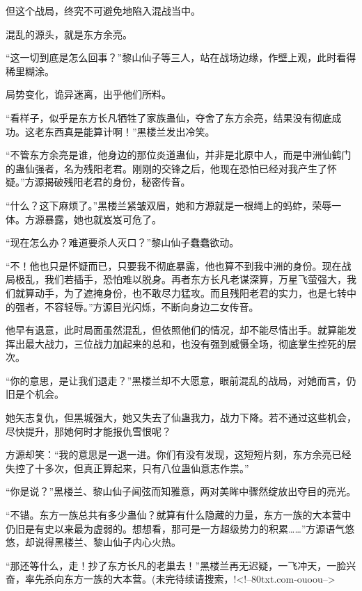 \begin{this_body}
但这个战局，终究不可避免地陷入混战当中。

混乱的源头，就是东方余亮。

“这一切到底是怎么回事？”黎山仙子等三人，站在战场边缘，作壁上观，此时看得稀里糊涂。

局势变化，诡异迷离，出乎他们所料。

“看样子，似乎是东方长凡牺牲了家族蛊仙，夺舍了东方余亮，结果没有彻底成功。这老东西真是能算计啊！”黑楼兰发出冷笑。

“不管东方余亮是谁，他身边的那位炎道蛊仙，并非是北原中人，而是中洲仙鹤门的蛊仙强者，名为残阳老君。刚刚的交锋之后，他现在恐怕已经对我产生了怀疑。”方源揭破残阳老君的身份，秘密传音。

“什么？这下麻烦了。”黑楼兰紧皱双眉，她和方源就是一根绳上的蚂蚱，荣辱一体。方源暴露，她也就岌岌可危了。

“现在怎么办？难道要杀人灭口？”黎山仙子蠢蠢欲动。

“不！他也只是怀疑而已，只要我不彻底暴露，他也算不到我中洲的身份。现在战局极乱，我们若插手，恐怕难以脱身。再者东方长凡老谋深算，万星飞萤强大，我们就算动手，为了遮掩身份，也不敢尽力猛攻。而且残阳老君的实力，也是七转中的强者，不容轻辱。”方源目光闪烁，不断向身边二女传音。

他早有退意，此时局面虽然混乱，但依照他们的情况，却不能尽情出手。就算能发挥出最大战力，三位战力加起来的总和，也没有强到威慑全场，彻底掌生控死的层次。

“你的意思，是让我们退走？”黑楼兰却不大愿意，眼前混乱的战局，对她而言，仍旧是个机会。

她矢志复仇，但黑城强大，她又失去了仙蛊我力，战力下降。若不通过这些机会，尽快提升，那她何时才能报仇雪恨呢？

方源却笑：“我的意思是一退一进。你们有没有发现，这短短片刻，东方余亮已经失控了十多次，但真正算起来，只有八位蛊仙意志作祟。”

“你是说？”黑楼兰、黎山仙子闻弦而知雅意，两对美眸中骤然绽放出夺目的亮光。

“不错。东方一族总共有多少蛊仙？就算有什么隐藏的力量，东方一族的大本营中仍旧是有史以来最为虚弱的。想想看，那可是一方超级势力的积累……”方源语气悠悠，却说得黑楼兰、黎山仙子内心火热。

“那还等什么，走！抄了东方长凡的老巢去！”黑楼兰再无迟疑，一飞冲天，一脸兴奋，率先杀向东方一族的大本营。(未完待续请搜索，!<!--80txt.com-ouoou-->

\end{this_body}

